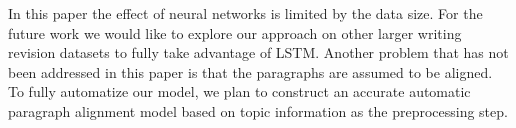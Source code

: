 \documentclass[11pt]{article}
\begin{document}
In this paper the effect of neural networks is limited by the data size. For the future work we would like to explore our approach on other larger writing revision datasets \cite{leecityu} to fully take advantage of LSTM. Another problem that has not been addressed in this paper is that the paragraphs are assumed to be aligned. To fully automatize our model, we plan to construct an accurate automatic paragraph alignment model \cite{barzilay2003sentence} based on topic information \cite{blei2003latent} as the preprocessing step. 





% 
% 



\end{document}
